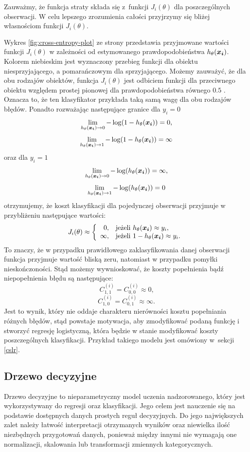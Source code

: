\documentclass[inzynierska]{pwr_wmat_praca_dyplomowa}
\theoremstyle{plain}
\numberwithin{theorem}{chapter}
\theoremstyle{definition}
\numberwithin{theorem}{chapter}
\begin{document}
Zauważmy, że funkcja straty składa się z~funkcji $J_i(\theta)$ dla poszczególnych obserwacji. W celu lepszego zrozumienia całości przyjrzymy się bliżej własnościom funkcji $J_i(\theta)$.

Wykres \ref{fig:cross-entropy-plot} ze strony \pageref{fig:cross-entropy-plot} przedstawia przyjmowane wartości funkcji $J_i(\theta)$ w zależności od estymowanego prawdopodobieństwa $h_{\theta}(\boldsymbol{x_i})$. Kolorem niebieskim jest wyznaczony przebieg funkcji dla obiektu niesprzyjającego, a pomarańczowym dla sprzyjającego. Możemy zauważyć, że dla obu rodzajów obiektów, funkcja $J_i(\theta)$ jest odbiciem funkcji dla przeciwnego obiektu względem prostej pionowej dla prawdopodobieństwa równego $0.5$ . Oznacza to, że ten klasyfikator przykłada taką samą wagę dla obu rodzajów błędów. Ponadto rozważając następujące granice dla $y_i=0$
$$ \lim\limits_{h_{\theta}(\boldsymbol{x_i})\to 0} -\log(1-h_{\theta}(\boldsymbol{x_i})) = 0 \text{,}$$
$$ \lim\limits_{h_{\theta}(\boldsymbol{x_i})\to 1} -\log(1-h_{\theta}(\boldsymbol{x_i})) = \infty $$
oraz dla $y_i=1$
$$ \lim\limits_{h_{\theta}(\boldsymbol{x_i})\to 0} -\log(h_{\theta}(\boldsymbol{x_i})) = \infty \text{,}$$
$$ \lim\limits_{h_{\theta}(\boldsymbol{x_i})\to 1} -\log(h_{\theta}(\boldsymbol{x_i})) = 0 $$
otrzymujemy, że koszt klasyfikacji dla pojedynczej obserwacji przyjmuje w przybliżeniu następujące wartości:
$$
J_i(\theta) \approx \left\{
\begin{array}{rl}
0, &\mbox{jeżeli $h_{\theta}(\boldsymbol{x_i}) \approx y_i$}, \\
\infty, &\mbox{jeżeli $1 - h_{\theta}(\boldsymbol{x_i}) \approx y_i$}.
\end{array}{}
\right.
$$
To znaczy, że w przypadku prawidłowego zaklasyfikowania danej obserwacji funkcja przyjmuje wartość bliską zeru, natomiast w przypadku pomyłki nieskończoności. Stąd możemy wywnioskować, że koszty popełnienia bądź niepopełnienia błędu są następujące:
$$ C^{(i)}_{1,1} = C^{(i)}_{0,0} \approx 0 \text{,}$$
$$ C^{(i)}_{1,0} = C^{(i)}_{0,1} \approx \infty \text{.}$$
Jest to wynik, który nie oddaje charakteru nierówności kosztu popełniania różnych błędów, stąd powstaje motywacja, aby zmodyfikować podaną funkcję i stworzyć regresję logistyczną, która będzie w stanie modyfikować koszty poszczególnych klasyfikacji. Przykład takiego modelu jest omówiony w~sekcji \ref{cslr}.

\subsection{Drzewo decyzyjne}
\label{drzewo}
Drzewo decyzyjne to nieparametryczny model uczenia nadzorowanego, który jest wykorzystywany do regresji oraz klasyfikacji. Jego celem jest nauczenie się na podstawie dostępnych danych prostych reguł decyzyjnych. Do jego największych zalet należy łatwość interpretacji otrzymanych wyników oraz niewielka ilość niezbędnych przygotowań danych, ponieważ między innymi nie wymagają one normalizacji, skalowania lub transformacji zmiennych kategorycznych.
\end{document}
